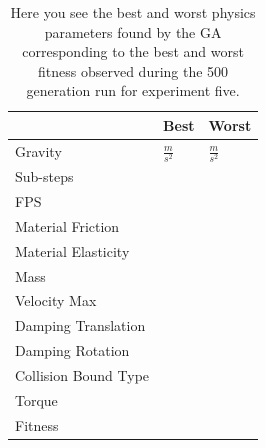 \begin{table}[htbp]
\centering
\footnotesize
\bgroup
\def\arraystretch{1.1}
\begin{tabular}{ | >{\centering\arraybackslash}m{3cm} | >{\centering\arraybackslash}m{3cm} | >{\centering\arraybackslash}m{3cm} | }
\cline{2-3}
\multicolumn{1}{c|}{}                 & \cellcolor{gray} Best         & \cellcolor{gray} Worst  \\ \hline
\cellcolor{gray} Gravity              & $\frac{m}{s^2}$  & $\frac{m}{s^2}$     \\ \hline
\cellcolor{gray} Sub-steps            &                              &                       \\ \hline
\cellcolor{gray} FPS                  &                             &                       \\ \hline
\cellcolor{gray} Material Friction    &                  &                      \\ \hline
\cellcolor{gray} Material Elasticity  &                 &           \\ \hline
\cellcolor{gray} Mass                 &                           &           \\ \hline
\cellcolor{gray} Velocity Max         &                         &                   \\ \hline
\cellcolor{gray} Damping Translation  &                           &           \\ \hline
\cellcolor{gray} Damping Rotation     &                 &           \\ \hline
\cellcolor{gray} Collision Bound Type &                         &             \\ \hline
\cellcolor{gray} Torque               &                  &            \\ \hline \hline
\cellcolor{gray} Fitness              &                   &            \\ \hline
\end{tabular}
\egroup
\caption[Experiment Five Best and Worst Physics Parameters Found]{Here you see the best and worst physics parameters found by the GA corresponding to the best and worst fitness observed during the 500 generation run for experiment five.}
\label{tab:exp5_best_worst_params}
\end{table}